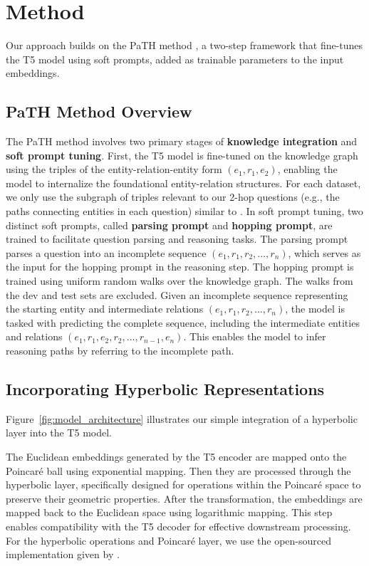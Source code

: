 \documentclass[11pt]{article}
\begin{document}
\section{Method}

Our approach builds on the PaTH method \citet{misra2023triggeringmultihopreasoningquestion}, a two-step framework that fine-tunes the T5 model using soft prompts, added as trainable parameters to the input embeddings.
\subsection{PaTH Method Overview}
The PaTH method involves two primary stages of \textbf{knowledge integration} and \textbf{soft prompt tuning}. 
First, the T5 model is fine-tuned on the knowledge graph using the triples of the entity-relation-entity form $(e_1, r_1, e_2)$, enabling the model to internalize the foundational entity-relation structures. For each dataset, we only use the subgraph of triples relevant to our 2-hop questions (e.g., the paths connecting entities in each question) similar to \citet{misra2023triggeringmultihopreasoningquestion}.
In soft prompt tuning, two distinct soft prompts, called \textbf{parsing prompt} and \textbf{hopping prompt}, are trained to facilitate question parsing and reasoning tasks. The parsing prompt parses a question into an incomplete sequence $(e_1, r_1, r_2, ..., r_n)$, which serves as the input for the hopping prompt in the reasoning step.
The hopping prompt is trained using uniform random walks over the knowledge graph. The walks from the dev and test sets are excluded. Given an incomplete sequence representing the starting entity and intermediate relations $(e_1, r_1, r_2, ..., r_n)$, the model is tasked with predicting the complete sequence, including the intermediate entities and relations $(e_1, r_1, e_2, r_2, ..., r_{n-1}, e_n)$. This enables the model to infer reasoning paths by referring to the incomplete path.

\subsection{Incorporating Hyperbolic Representations}
Figure~\ref{fig:model_architecture} illustrates our simple integration of a hyperbolic layer into the T5 model.

The Euclidean embeddings generated by the T5 encoder are mapped onto the Poincaré ball using exponential mapping. 
Then they are processed through the hyperbolic layer, specifically designed for operations within the Poincaré space to preserve their geometric properties. After the transformation, the embeddings are mapped back to the Euclidean space using logarithmic mapping. This step enables compatibility with the T5 decoder for effective downstream processing. For the hyperbolic operations and Poincaré layer, we use the open-sourced implementation given by \citet{vanspengler2023poincareresnet}. 
\end{document}
